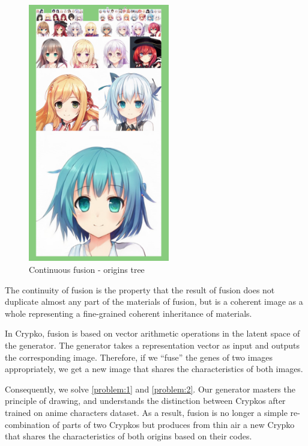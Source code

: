 \documentclass[b5paper]{article}
\begin{document}
\begin{figure}[h]
  \centering
  \includegraphics[width=0.55\textwidth]{703057_tree.png}
  \caption{Continuous fusion - origins tree}\label{origins_tree}
\end{figure}

The continuity of fusion is the property that the result of fusion does not duplicate almost any part of the materials of fusion, but is a coherent image as a whole representing a fine-grained coherent inheritance of materials.

In Crypko, fusion is based on vector arithmetic operations in the latent space of the generator\cite{radford2015unsupervised}. The generator takes a representation vector as input and outputs the corresponding image. Therefore, if we ``fuse'' the genes of two images appropriately, we get a new image that shares the characteristics of both images.

Consequently, we solve \ref{problem:1} and \ref{problem:2}. 
Our generator masters the principle of drawing, and understands the distinction between Crypkos after trained on anime characters dataset. 
As a result, fusion is no longer a simple re-combination of parts of two Crypkos but produces from thin air a new Crypko that shares the characteristics of both origins based on their codes.
\end{document}

